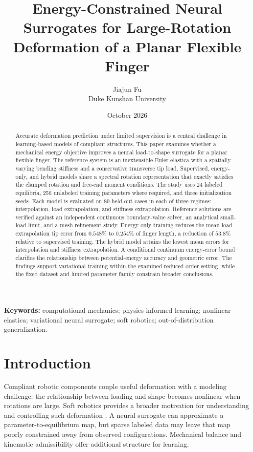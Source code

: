 \documentclass[11pt,a4paper]{article}
\title{\textbf{Energy-Constrained Neural Surrogates for Large-Rotation Deformation of a Planar Flexible Finger}}
\author{Jiajun Fu\\\small Duke Kunshan University}
\date{October 2026}
\begin{document}
\maketitle
\begin{abstract}
Accurate deformation prediction under limited supervision is a central challenge in learning-based models of compliant structures. This paper examines whether a mechanical energy objective improves a neural load-to-shape surrogate for a planar flexible finger. The reference system is an inextensible Euler elastica with a spatially varying bending stiffness and a conservative transverse tip load. Supervised, energy-only, and hybrid models share a spectral rotation representation that exactly satisfies the clamped rotation and free-end moment conditions. The study uses 24 labeled equilibria, 256 unlabeled training parameters where required, and three initialization seeds. Each model is evaluated on 80 held-out cases in each of three regimes: interpolation, load extrapolation, and stiffness extrapolation. Reference solutions are verified against an independent continuous boundary-value solver, an analytical small-load limit, and a mesh-refinement study. Energy-only training reduces the mean load-extrapolation tip error from $0.548\%$ to $0.254\%$ of finger length, a reduction of $53.8\%$ relative to supervised training. The hybrid model attains the lowest mean errors for interpolation and stiffness extrapolation. A conditional continuum energy-error bound clarifies the relationship between potential-energy accuracy and geometric error. The findings support variational training within the examined reduced-order setting, while the fixed dataset and limited parameter family constrain broader conclusions.
\end{abstract}
\noindent\textbf{Keywords:} computational mechanics; physics-informed learning; nonlinear elastica; variational neural surrogate; soft robotics; out-of-distribution generalization.

\section{Introduction}
Compliant robotic components couple useful deformation with a modeling challenge: the relationship between loading and shape becomes nonlinear when rotations are large. Soft robotics provides a broader motivation for understanding and controlling such deformation \cite{rus2015}. A neural surrogate can approximate a parameter-to-equilibrium map, but sparse labeled data may leave that map poorly constrained away from observed configurations. Mechanical balance and kinematic admissibility offer additional structure for learning.
\end{document}
